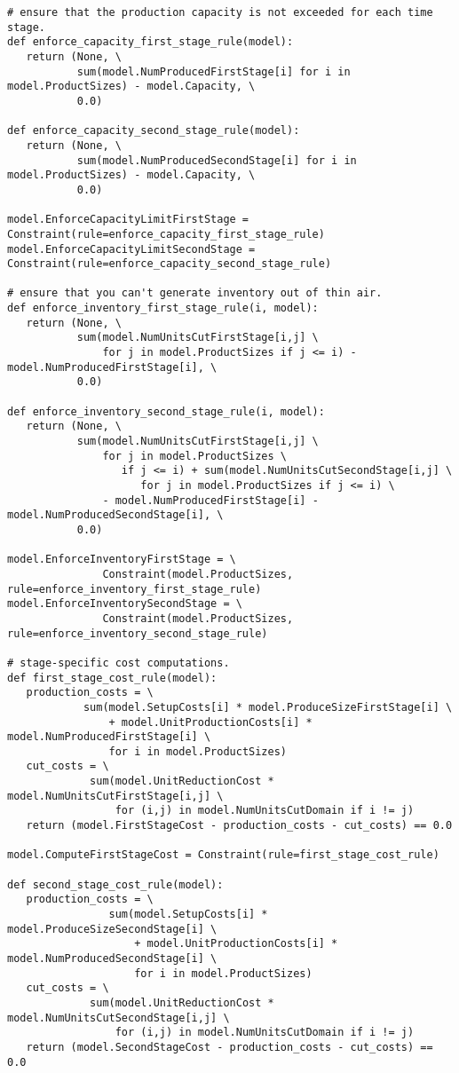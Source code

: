 {\begin{verbatim}
# ensure that the production capacity is not exceeded for each time stage.
def enforce_capacity_first_stage_rule(model):
   return (None, \
           sum(model.NumProducedFirstStage[i] for i in model.ProductSizes) - model.Capacity, \
           0.0)

def enforce_capacity_second_stage_rule(model):
   return (None, \
           sum(model.NumProducedSecondStage[i] for i in model.ProductSizes) - model.Capacity, \
           0.0)

model.EnforceCapacityLimitFirstStage = Constraint(rule=enforce_capacity_first_stage_rule)
model.EnforceCapacityLimitSecondStage = Constraint(rule=enforce_capacity_second_stage_rule)

# ensure that you can't generate inventory out of thin air.
def enforce_inventory_first_stage_rule(i, model):
   return (None, \
           sum(model.NumUnitsCutFirstStage[i,j] \
               for j in model.ProductSizes if j <= i) - model.NumProducedFirstStage[i], \
           0.0)

def enforce_inventory_second_stage_rule(i, model):
   return (None, \
           sum(model.NumUnitsCutFirstStage[i,j] \
               for j in model.ProductSizes \
                  if j <= i) + sum(model.NumUnitsCutSecondStage[i,j] \
                     for j in model.ProductSizes if j <= i) \
               - model.NumProducedFirstStage[i] - model.NumProducedSecondStage[i], \
           0.0)

model.EnforceInventoryFirstStage = \
               Constraint(model.ProductSizes, rule=enforce_inventory_first_stage_rule)
model.EnforceInventorySecondStage = \
               Constraint(model.ProductSizes, rule=enforce_inventory_second_stage_rule)

# stage-specific cost computations.
def first_stage_cost_rule(model):
   production_costs = \
            sum(model.SetupCosts[i] * model.ProduceSizeFirstStage[i] \
                + model.UnitProductionCosts[i] * model.NumProducedFirstStage[i] \
                for i in model.ProductSizes)
   cut_costs = \
             sum(model.UnitReductionCost * model.NumUnitsCutFirstStage[i,j] \
                 for (i,j) in model.NumUnitsCutDomain if i != j)
   return (model.FirstStageCost - production_costs - cut_costs) == 0.0

model.ComputeFirstStageCost = Constraint(rule=first_stage_cost_rule)

def second_stage_cost_rule(model):
   production_costs = \
                sum(model.SetupCosts[i] * model.ProduceSizeSecondStage[i] \
                    + model.UnitProductionCosts[i] * model.NumProducedSecondStage[i] \
                    for i in model.ProductSizes)
   cut_costs = \
             sum(model.UnitReductionCost * model.NumUnitsCutSecondStage[i,j] \
                 for (i,j) in model.NumUnitsCutDomain if i != j)
   return (model.SecondStageCost - production_costs - cut_costs) == 0.0


\end{verbatim}}
